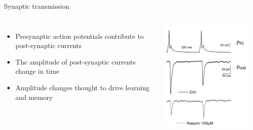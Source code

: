 \documentclass[aspectratio=169]{beamer}
\begin{document}
\begin{frame}{Synaptic transmission}

\begin{columns}
\begin{itemize}
\item Presynaptic action potentials contribute to post-synaptic currents
\item The amplitude of post-synaptic currents change in time 
\item Amplitude changes thought to drive learning and memory
\end{itemize}

\centering
\includegraphics[width=65mm]{figure-3}
\end{columns}
\end{frame}
\end{document}
